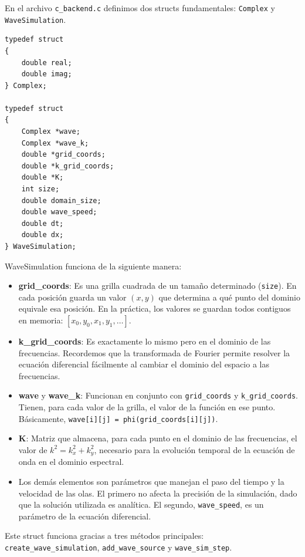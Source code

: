 \documentclass[a4paper]{article}
\begin{document}
En el archivo \texttt{c\_backend.c} definimos dos structs fundamentales: \texttt{Complex} y \texttt{WaveSimulation}.

\begin{verbatim}
typedef struct
{
    double real;
    double imag;
} Complex;

typedef struct
{
    Complex *wave;
    Complex *wave_k;
    double *grid_coords;
    double *k_grid_coords;
    double *K;
    int size;
    double domain_size;
    double wave_speed;
    double dt;
    double dx;
} WaveSimulation;
\end{verbatim}

WaveSimulation funciona de la siguiente manera:
\begin{itemize}
    \item \textbf{grid\_coords}: Es una grilla cuadrada de un tamaño determinado (\texttt{size}). En cada posición guarda un valor $(x, y)$ que determina a qué punto del dominio equivale esa posición. En la práctica, los valores se guardan todos contiguos en memoria: $[x_0, y_0, x_1, y_1, \ldots]$.
    \item \textbf{k\_grid\_coords}: Es exactamente lo mismo pero en el dominio de las frecuencias. Recordemos que la transformada de Fourier permite resolver la ecuación diferencial fácilmente al cambiar el dominio del espacio a las frecuencias.
    \item \textbf{wave} y \textbf{wave\_k}: Funcionan en conjunto con \texttt{grid\_coords} y \texttt{k\_grid\_coords}. Tienen, para cada valor de la grilla, el valor de la función en ese punto. Básicamente, \texttt{wave[i][j] = phi(grid\_coords[i][j])}.
    \item \textbf{K}: Matriz que almacena, para cada punto en el dominio de las frecuencias, el valor de $k^2 = k_x^2 + k_y^2$, necesario para la evolución temporal de la ecuación de onda en el dominio espectral.
    \item Los demás elementos son parámetros que manejan el paso del tiempo y la velocidad de las olas. El primero no afecta la precisión de la simulación, dado que la solución utilizada es analítica. El segundo, \texttt{wave\_speed}, es un parámetro de la ecuación diferencial.
\end{itemize}

Este struct funciona gracias a tres métodos principales: \texttt{create\_wave\_simulation}, \texttt{add\_wave\_source} y \texttt{wave\_sim\_step}.
\end{document}
